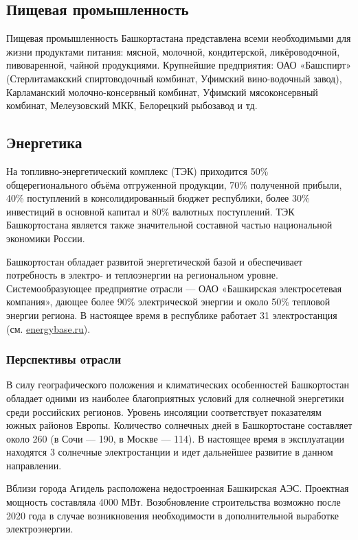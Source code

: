 \subsection{Пищевая промышленность}

Пищевая промышленность Башкортастана представлена всеми необходимыми для жизни продуктами питания: мясной, молочной, кондитерской, ликёроводочной, пивоваренной, чайной продукциями. Крупнейшие предприятия: ОАО «Башспирт» (Стерлитамакский спиртоводочный комбинат, Уфимский вино-водочный завод), Карламанский молочно-консервный комбинат, Уфимский мясоконсервный комбинат, Мелеузовский МКК, Белорецкий рыбозавод и тд.

\subsection{Энергетика}

На топливно-энергетический комплекс (ТЭК) приходится 50\% общерегионального объёма отгруженной продукции, 70\% полученной прибыли, 40\% поступлений в консолидированный бюджет республики, более 30\% инвестиций в основной капитал и 80\% валютных поступлений. ТЭК Башкортостана является также значительной составной частью национальной экономики России.

Башкортостан обладает развитой энергетической базой и обеспечивает потребность в электро- и теплоэнергии на региональном уровне. Системообразующее предприятие отрасли — ОАО «Башкирская электросетевая компания», дающее более 90\% электрической энергии и около 50\% тепловой энергии региона. В настоящее время в республике работает 31 электростанция (см. \href{https://energybase.ru/region/respublika-bashkortostan}{energybase.ru}).

\subsubsection{Перспективы отрасли}

В силу географического положения и климатических особенностей Башкортостан обладает одними из наиболее благоприятных условий для солнечной энергетики среди российских регионов. Уровень инсоляции соответствует показателям южных районов Европы. Количество солнечных дней в Башкортостане составляет около 260 (в Сочи — 190, в Москве — 114). В настоящее время в эксплуатации находятся 3 солнечные электростанции и идет дальнейшее развитие в данном направлении. 

Вблизи города Агидель расположена недостроенная Башкирская АЭС. Проектная мощность составляла 4000 МВт. Возобновление строительства возможно после 2020 года в случае возникновения необходимости в дополнительной выработке электроэнергии.

